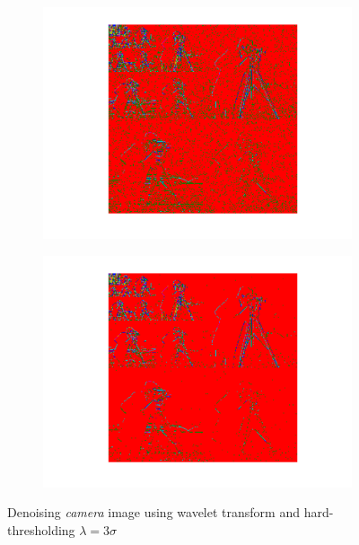 \documentclass[11pt]{article}
\begin{document}
\begin{figure}[H]
	\begin{subfigure}{0.4\textwidth}
        \centering
		\includegraphics[trim=0.5in 0.1in 0.5in 0in, width=\textwidth]{Fig_Camera_WaveletCoeff_Noisy_Sigma_10.png}
		\caption{}
		\label{Fig_Camera_WaveletCoeff_Noisy_Sigma_10}
	\end{subfigure}
	\begin{subfigure}{0.4\textwidth}
        \centering
		\includegraphics[trim=0.5in 0.1in 0.5in 0in, width=\textwidth]{Fig_Camera_WaveletCoeff_Denoised_Sigma_10.png}
		\caption{}
		\label{Fig_Camera_WaveletCoeff_Denoised_Sigma_10}
	\end{subfigure}
	\caption{Denoising \textit{camera} image using wavelet transform and hard-thresholding $\lambda=3\sigma$}
	\label{Fig_Camera_Denoising_Sigma_10}
\end{figure}
\end{document}
